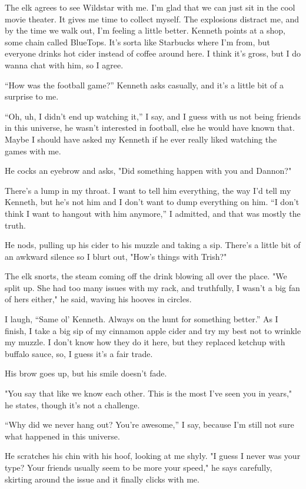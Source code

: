 The elk agrees to see Wildstar with me. I'm glad that we can just sit in
the cool movie theater. It gives me time to collect myself. The
explosions distract me, and by the time we walk out, I'm feeling a
little better. Kenneth points at a shop, some chain called BlueTops.
It's sorta like Starbucks where I'm from, but everyone drinks hot cider
instead of coffee around here. I think it's gross, but I do wanna chat
with him, so I agree.

``How was the football game?'' Kenneth asks casually, and it's a little
bit of a surprise to me.

``Oh, uh, I didn't end up watching it,'' I say, and I guess with us not
being friends in this universe, he wasn't interested in football, else
he would have known that. Maybe I should have asked my Kenneth if he
ever really liked watching the games with me.

He cocks an eyebrow and asks, "Did something happen with you and
Dannon?"

There's a lump in my throat. I want to tell him everything, the way I'd
tell my Kenneth, but he's not him and I don't want to dump everything on
him. ``I don't think I want to hangout with him anymore,'' I admitted, and
that was mostly the truth.

He nods, pulling up his cider to his muzzle and taking a sip. There's a
little bit of an awkward silence so I blurt out, "How's things with
Trish?"

The elk snorts, the steam coming off the drink blowing all over the
place. "We split up. She had too many issues with my rack, and
truthfully, I wasn't a big fan of hers either," he said, waving his
hooves in circles.

I laugh, ``Same ol' Kenneth. Always on the hunt for something better.'' As
I finish, I take a big sip of my cinnamon apple cider and try my best
not to wrinkle my muzzle. I don't know how they do it here, but they
replaced ketchup with buffalo sauce, so, I guess it's a fair trade.

His brow goes up, but his smile doesn't fade.

"You say that like we know each other. This is the most I've seen you in
years," he states, though it's not a challenge.

``Why did we never hang out? You're awesome,'' I say, because I'm still
not sure what happened in this universe.

He scratches his chin with his hoof, looking at me shyly. "I guess I
never was your type? Your friends usually seem to be more your speed,"
he says carefully, skirting around the issue and it finally clicks with
me.

